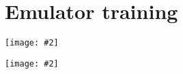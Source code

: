 \documentclass[aps,prc,reprint,amsmath]{revtex4-1}
\newcommand{\widefig}[3][t]{
  \begin{figure*}[#1]
    \texttt{[image: \#2]}
    \caption{\label{fig:#2}#3}
  \end{figure*}
}
\begin{document}
\appendix

\section{\label{app:train}Emulator training}

\widefig{train_glb}{
  Posterior distributions of the principal component Gaussian process hyperparameters for the Glauber model.
  The notation $\ell\;x$ means the squared-exponential correlation length for parameter $x$.
}

\widefig{train_kln}{
  Same as FIG.~\ref{fig:train_glb} for the KLN model.
}




\end{document}
